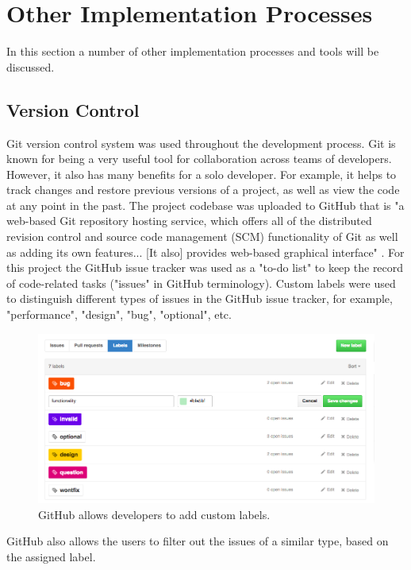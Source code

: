\section{Other Implementation Processes}
\label{sec:otherprocesses}
In this section a number of other implementation processes and tools will be discussed.

\subsection{Version Control}
\label{subsec:git}
Git version control system was used throughout the development process. Git is known for being a very useful tool for collaboration across teams of developers. However, it also has many benefits for a solo developer. For example, it helps to track changes and restore previous versions of a project, as well as view the code at any point in the past. The project codebase was uploaded to GitHub that is "a web-based Git repository hosting service, which offers all of the distributed revision control and source code management (SCM) functionality of Git as well as adding its own features... [It also] provides web-based graphical interface" \citep{wiki:GitHub}. For this project the GitHub issue tracker was used as a "to-do list" to keep the record of code-related tasks ("issues" in GitHub terminology). Custom labels were used to distinguish different types of issues in the GitHub issue tracker, for example, "performance", "design", "bug", "optional", etc.

\begin{figure}[H]
	\begin{center}
		\includegraphics[width=.90\textwidth]{impl/images/githubLabelsChoice}
		\caption{GitHub allows developers to add custom labels.} \label{fig:using:githublabelschoice}
	\end{center}
\end{figure}

GitHub also allows the users to filter out the issues of a similar type, based on the assigned label.

